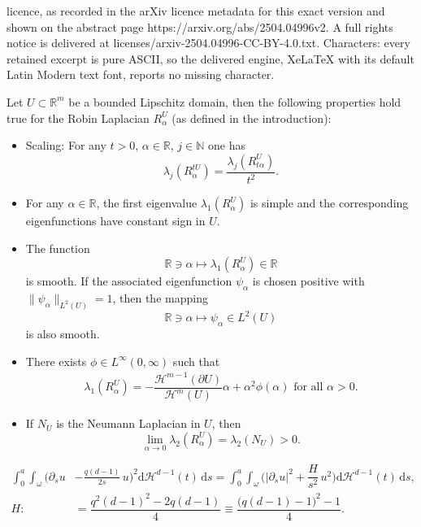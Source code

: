 \documentclass[10pt,a4paper]{amsart}
\newcommand{\N}{\mathbb{N}}
\newcommand{\R}{\mathbb{R}}
\newcommand{\dd}{\mathrm{d}}
\renewcommand{\H}{\mathcal{H}}
\begin{document}
licence, as recorded in the arXiv licence metadata for this exact version and shown on the abstract page https://arxiv.org/abs/2504.04996v2. A full rights notice is delivered at licenses/arxiv-2504.04996-CC-BY-4.0.txt. Characters: every retained excerpt is pure ASCII, so the delivered engine, XeLaTeX with its default Latin Modern text font, reports no missing character.
	\begin{lemma}\label{basic properties}
		Let $U\subset\R^m$ be a bounded Lipschitz domain,
		then the following properties hold true for the Robin Laplacian $R^U_\alpha$ (as defined in the introduction):
		\begin{itemize}
			
			\item[(i)]Scaling: For any $t>0$, $\alpha\in\R$, $j\in\N$ one has
			\[
			\lambda_j(R^{tU}_\alpha)=\dfrac{\lambda_j(R^{U}_{t\alpha})}{t^2}.
			\]
			
			\item[(ii)] For any $\alpha\in\R$, the first eigenvalue $\lambda_1(R^{U}_{\alpha})$
				is simple and the corresponding eigenfunctions have constant sign in $U$.
				
			\item[(iii)] The function
			\[
			\R\ni\alpha\mapsto\lambda_1(R^U_\alpha)\in\R
			\]
			is smooth. If the associated eigenfunction $\psi_\alpha$ is chosen positive with $\|\psi_\alpha\|_{L^2(U)}=1$, then the mapping
			\[
			\R\ni\alpha\mapsto \psi_\alpha\in L^2(U)
			\]
			is also smooth.

			\item[(iv)]
			
			 There exists $\phi\in L^{\infty}(0,\infty)$ such that
\begin{gather*}
\lambda_1(R^{U}_{\alpha})=-\dfrac{\H^{m-1}(\partial U)}{\H^m(U)}\alpha+\alpha^2\phi(\alpha)\text{ for all }\alpha>0.
\end{gather*}
			
			\item[(v)] If $N_U$ is the Neumann Laplacian in $U$, then
			\[
			\lim_{\alpha\to0}\lambda_2(R^{U}_{\alpha})=\lambda_2(N_U)>0.
			\]
			
			
		\end{itemize}
	\end{lemma}

\begin{align}
\int_0^a \int_{\omega}\Big(\partial_su &-\frac{q(d-1)}{2s}\, u\Big)^2\dd\H^{d-1}(t)\,\dd s=\int_0^a \int_{\omega}\bigg(|\partial_su|^2+\dfrac{H}{s^2}\,u^2\bigg)\dd\H^{d-1}(t)\,\dd s,\nonumber\\
H:&=\dfrac{q^2(d-1)^2-2q(d-1)}{4}\equiv \dfrac{\big(q(d-1)-1\big)^2-1}{4}.\label{hhh}
\end{align}
\end{document}
